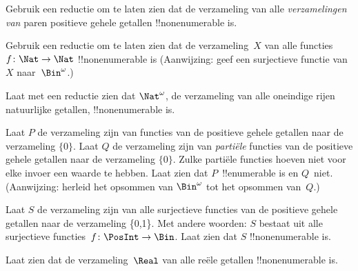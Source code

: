 \documentclass[../../../include/open-logic-section]{subfiles}
\begin{document}
\begin{prob}
Gebruik een reductie om te laten zien dat de verzameling van alle
\emph{verzamelingen van} paren positieve gehele getallen
!!{nonenumerable} is.
\end{prob}

\begin{prob}\label{sfr:siz:red:prob:nat-nat}
  Gebruik een reductie om te laten zien dat de verzameling~$X$ van alle
  functies $f\colon \Nat \to \Nat$ !!{nonenumerable} is (Aanwijzing:
  geef een surjectieve functie van $X$ naar~$\Bin^\omega$.)
\end{prob}

\begin{prob}
Laat met een reductie zien dat $\Nat^\omega$, de verzameling van alle
oneindige rijen natuurlijke getallen, !!{nonenumerable} is.
\end{prob}

\begin{prob}
Laat $P$ de verzameling zijn van functies van de positieve gehele
getallen naar de verzameling $\{0\}$. Laat $Q$ de verzameling zijn van
\emph{partiële} functies van de positieve gehele getallen naar de
verzameling $\{0\}$. Zulke partiële functies hoeven niet voor elke
invoer een waarde te hebben. Laat zien dat $P$~!!{enumerable} is en
$Q$~niet. (Aanwijzing: herleid het opsommen van $\Bin^\omega$ tot het
opsommen van~$Q$.)
\end{prob}

\begin{prob}
Laat $S$ de verzameling zijn van alle surjectieve functies van de
positieve gehele getallen naar de verzameling \{0,1\}. Met andere
woorden: $S$ bestaat uit alle surjectieve functies~$f\colon
\PosInt \to \Bin$. Laat zien dat $S$ !!{nonenumerable} is.
\end{prob}

\begin{prob}
Laat zien dat de verzameling~$\Real$ van alle reële getallen
!!{nonenumerable} is.
\end{prob}
\end{document}
